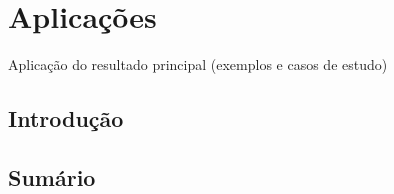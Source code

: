 \chapter{Aplicações}

Aplicação do resultado principal (exemplos e casos de estudo)

\section{Introdução}

\section{Sumário}